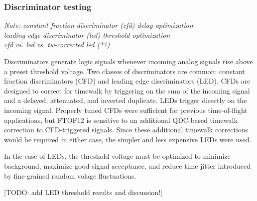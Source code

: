 \subsubsection{Discriminator testing}

{\it Note:
constant fraction discriminator (cfd) delay optimization\\
leading edge discriminator (led) threshold optimization\\
cfd vs. led vs. tw-corrected led (*?)\\
}

Discriminators generate logic signals whenever incoming analog signals rise above a preset threshold voltage.  Two classes of discriminators are common:  constant fraction discriminators (CFD) and leading edge discriminators (LED).  CFDs are designed to correct for timewalk by triggering on the sum of the incoming signal and a delayed, attenuated, and inverted duplicate.  LEDs trigger directly on the incoming signal.  Properly tuned CFDs were sufficient for previous time-of-flight applications, but FTOF12 is sensitive to an additional QDC-based timewalk correction to CFD-triggered signals.  Since these additional timewalk corrections would be required in either case, the simpler and less expensive LEDs were used.

In the case of LEDs, the threshold voltage must be optimized to minimize background, maximize good signal acceptance, and reduce time jitter introduced by fine-grained random volage fluctuations.

[TODO: add LED threshold results and discussion!]
